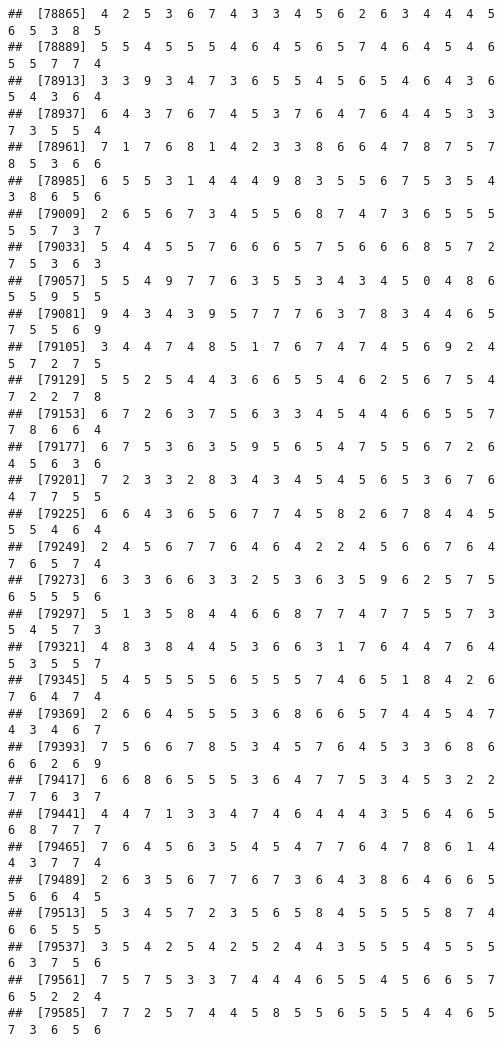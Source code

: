 \documentclass[
]{book}
\begin{document}
\begin{verbatim}
##  [78865]  4  2  5  3  6  7  4  3  3  4  5  6  2  6  3  4  4  4  5  6  5  3  8  5
##  [78889]  5  5  4  5  5  5  4  6  4  5  6  5  7  4  6  4  5  4  6  5  5  7  7  4
##  [78913]  3  3  9  3  4  7  3  6  5  5  4  5  6  5  4  6  4  3  6  5  4  3  6  4
##  [78937]  6  4  3  7  6  7  4  5  3  7  6  4  7  6  4  4  5  3  3  7  3  5  5  4
##  [78961]  7  1  7  6  8  1  4  2  3  3  8  6  6  4  7  8  7  5  7  8  5  3  6  6
##  [78985]  6  5  5  3  1  4  4  4  9  8  3  5  5  6  7  5  3  5  4  3  8  6  5  6
##  [79009]  2  6  5  6  7  3  4  5  5  6  8  7  4  7  3  6  5  5  5  5  5  7  3  7
##  [79033]  5  4  4  5  5  7  6  6  6  5  7  5  6  6  6  8  5  7  2  7  5  3  6  3
##  [79057]  5  5  4  9  7  7  6  3  5  5  3  4  3  4  5  0  4  8  6  5  5  9  5  5
##  [79081]  9  4  3  4  3  9  5  7  7  7  6  3  7  8  3  4  4  6  5  7  5  5  6  9
##  [79105]  3  4  4  7  4  8  5  1  7  6  7  4  7  4  5  6  9  2  4  5  7  2  7  5
##  [79129]  5  5  2  5  4  4  3  6  6  5  5  4  6  2  5  6  7  5  4  7  2  2  7  8
##  [79153]  6  7  2  6  3  7  5  6  3  3  4  5  4  4  6  6  5  5  7  7  8  6  6  4
##  [79177]  6  7  5  3  6  3  5  9  5  6  5  4  7  5  5  6  7  2  6  4  5  6  3  6
##  [79201]  7  2  3  3  2  8  3  4  3  4  5  4  5  6  5  3  6  7  6  4  7  7  5  5
##  [79225]  6  6  4  3  6  5  6  7  7  4  5  8  2  6  7  8  4  4  5  5  5  4  6  4
##  [79249]  2  4  5  6  7  7  6  4  6  4  2  2  4  5  6  6  7  6  4  7  6  5  7  4
##  [79273]  6  3  3  6  6  3  3  2  5  3  6  3  5  9  6  2  5  7  5  6  5  5  5  6
##  [79297]  5  1  3  5  8  4  4  6  6  8  7  7  4  7  7  5  5  7  3  5  4  5  7  3
##  [79321]  4  8  3  8  4  4  5  3  6  6  3  1  7  6  4  4  7  6  4  5  3  5  5  7
##  [79345]  5  4  5  5  5  5  6  5  5  5  7  4  6  5  1  8  4  2  6  7  6  4  7  4
##  [79369]  2  6  6  4  5  5  5  3  6  8  6  6  5  7  4  4  5  4  7  4  3  4  6  7
##  [79393]  7  5  6  6  7  8  5  3  4  5  7  6  4  5  3  3  6  8  6  6  6  2  6  9
##  [79417]  6  6  8  6  5  5  5  3  6  4  7  7  5  3  4  5  3  2  2  7  7  6  3  7
##  [79441]  4  4  7  1  3  3  4  7  4  6  4  4  4  3  5  6  4  6  5  6  8  7  7  7
##  [79465]  7  6  4  5  6  3  5  4  5  4  7  7  6  4  7  8  6  1  4  4  3  7  7  4
##  [79489]  2  6  3  5  6  7  7  6  7  3  6  4  3  8  6  4  6  6  5  5  6  6  4  5
##  [79513]  5  3  4  5  7  2  3  5  6  5  8  4  5  5  5  5  8  7  4  6  6  5  5  5
##  [79537]  3  5  4  2  5  4  2  5  2  4  4  3  5  5  5  4  5  5  5  6  3  7  5  6
##  [79561]  7  5  7  5  3  3  7  4  4  4  6  5  5  4  5  6  6  5  7  6  5  2  2  4
##  [79585]  7  7  2  5  7  4  4  5  8  5  5  6  5  5  5  4  4  6  5  7  3  6  5  6

\end{verbatim}
\end{document}
